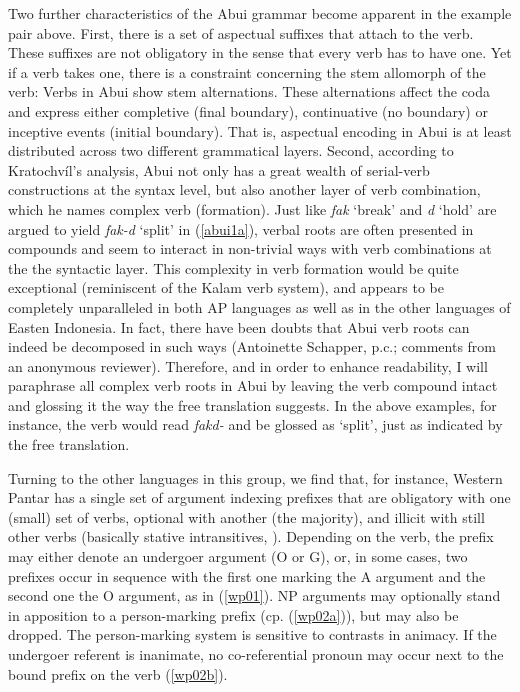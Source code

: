Two further characteristics of the Abui grammar become apparent in the example pair above. First, there is a set of aspectual suffixes that attach to the verb. These suffixes are not obligatory in the sense that every verb has to have one. Yet if a verb takes one, there is a constraint concerning the stem allomorph of the verb: Verbs in Abui show stem alternations. These alternations affect the coda and express either completive (final boundary), continuative (no boundary) or inceptive events (initial boundary). That is, aspectual encoding in Abui is at least distributed across two different grammatical layers. Second, according to Kratochvíl's analysis, Abui not only has a great wealth of serial-verb constructions at the syntax level, but also another layer of verb combination, which he names complex verb (formation). Just like \textit{fak} `break' and \textit{d} `hold' are argued to yield \textit{fak-d} `split' in (\ref{abui1a}), verbal roots are often presented in compounds and seem to interact in non-trivial ways with verb combinations at the the syntactic layer. This complexity in verb formation would be quite exceptional (reminiscent of the Kalam verb system), and appears to be completely unparalleled in both AP languages as well as in the other languages of Easten Indonesia. In fact, there have been doubts that Abui verb roots can indeed be decomposed in such ways (Antoinette Schapper, p.c.;  comments from an anonymous reviewer). Therefore, and in order to enhance readability, I will paraphrase all complex verb roots in Abui by leaving the verb compound intact and glossing it the way the free translation suggests. In the above examples, for instance, the verb would read \textit{fakd-} and be glossed as `split', just as indicated by the free translation.

Turning to the other languages in this group, we find that, for instance, Western Pantar has a single set of argument indexing prefixes that are obligatory with one (small) set of verbs, optional with another (the majority), and illicit with still other verbs (basically stative intransitives, \citealt[76]{holton2014western}). Depending on the verb, the prefix may either denote an undergoer argument (O or G), or, in some cases, two prefixes occur in sequence with the first one marking the A argument and the second one the O argument, as in (\ref{wp01}). NP arguments may optionally stand in apposition to a person-marking prefix (cp. (\ref{wp02a})), but may also be dropped. The person-marking system is sensitive to contrasts in animacy. If the undergoer referent is inanimate, no co-referential pronoun may occur next to the bound prefix on the verb (\ref{wp02b}).


